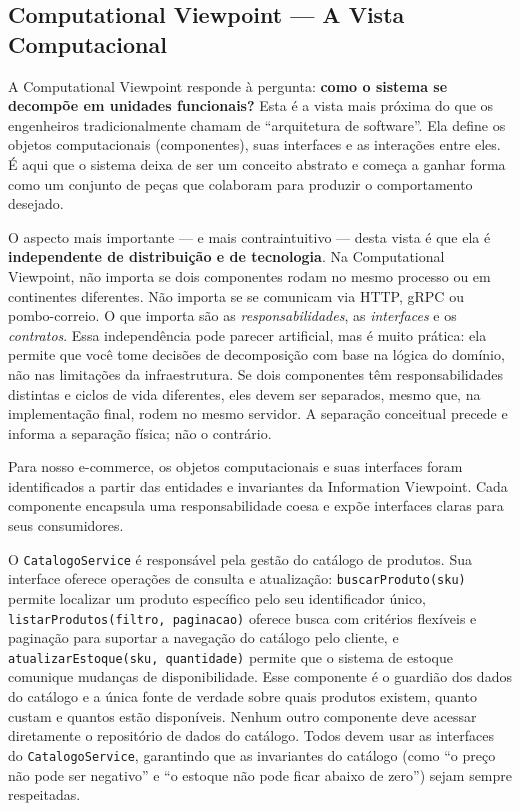 \subsection{Computational Viewpoint --- A Vista Computacional}

A Computational Viewpoint responde à pergunta: \textbf{como o sistema se decompõe
em unidades funcionais?} Esta é a vista mais próxima do que os engenheiros
tradicionalmente chamam de ``arquitetura de software''. Ela define os objetos
computacionais (componentes), suas interfaces e as interações entre eles. É aqui
que o sistema deixa de ser um conceito abstrato e começa a ganhar forma como um
conjunto de peças que colaboram para produzir o comportamento desejado.

O aspecto mais importante --- e mais contraintuitivo --- desta vista é que ela é
\textbf{independente de distribuição e de tecnologia}. Na Computational Viewpoint,
não importa se dois componentes rodam no mesmo processo ou em continentes
diferentes. Não importa se se comunicam via HTTP, gRPC ou pombo-correio. O que
importa são as \emph{responsabilidades}, as \emph{interfaces} e os
\emph{contratos}. Essa independência pode parecer artificial, mas é muito
prática: ela permite que você tome decisões de decomposição com base na lógica do
domínio, não nas limitações da infraestrutura. Se dois componentes têm
responsabilidades distintas e ciclos de vida diferentes, eles devem ser separados,
mesmo que, na implementação final, rodem no mesmo servidor. A separação
conceitual precede e informa a separação física; não o contrário.

Para nosso e-commerce, os objetos computacionais e suas interfaces foram
identificados a partir das entidades e invariantes da Information Viewpoint. Cada
componente encapsula uma responsabilidade coesa e expõe interfaces claras para
seus consumidores.

O \texttt{CatalogoService} é responsável pela gestão do catálogo de produtos. Sua
interface oferece operações de consulta e atualização: \texttt{buscarProduto(sku)}
permite localizar um produto específico pelo seu identificador único,
\texttt{listarProdutos(filtro, paginacao)} oferece busca com critérios flexíveis
e paginação para suportar a navegação do catálogo pelo cliente, e
\texttt{atualizarEstoque(sku, quantidade)} permite que o sistema de estoque
comunique mudanças de disponibilidade. Esse componente é o guardião dos dados do
catálogo e a única fonte de verdade sobre quais produtos existem, quanto custam e
quantos estão disponíveis. Nenhum outro componente deve acessar diretamente o
repositório de dados do catálogo. Todos devem usar as interfaces do
\texttt{CatalogoService}, garantindo que as invariantes do catálogo (como ``o
preço não pode ser negativo'' e ``o estoque não pode ficar abaixo de zero'')
sejam sempre respeitadas.

